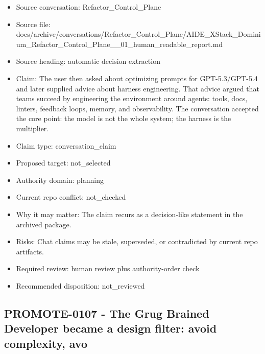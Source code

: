 \documentclass[11pt,a4paper]{report}
\begin{document}
\begin{itemize}
\item Source conversation: Refactor\_Control\_Plane
\item Source file: docs/archive/conversations/Refactor\_Control\_Plane/AIDE\_XStack\_Dominium\_Refactor\_Control\_Plane\_\_01\_human\_readable\_report.md
\item Source heading: automatic decision extraction
\item Claim: The user then asked about optimizing prompts for GPT-5.3/GPT-5.4 and later supplied advice about harness engineering. That advice argued that teams succeed by engineering the environment around agents: tools, docs, linters, feedback loops, memory, and observability. The conversation accepted the core point: the model is not the whole system; the harness is the multiplier.
\item Claim type: conversation\_claim
\item Proposed target: not\_selected
\item Authority domain: planning
\item Current repo conflict: not\_checked
\item Why it may matter: The claim recurs as a decision-like statement in the archived package.
\item Risks: Chat claims may be stale, superseded, or contradicted by current repo artifacts.
\item Required review: human review plus authority-order check
\item Recommended disposition: not\_reviewed
\end{itemize}

\subsection{PROMOTE-0107 - The Grug Brained Developer became a design filter: avoid complexity, avo}
\end{document}
